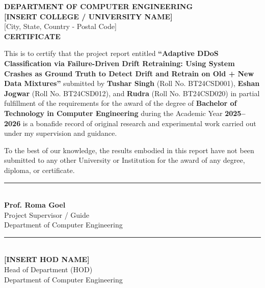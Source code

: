 \documentclass[12pt,a4paper,oneside]{report}
\begin{document}
\newpage
\thispagestyle{plain}
\begin{center}
{\Large \textbf{DEPARTMENT OF COMPUTER ENGINEERING}}\\[0.2cm]
{\large \textbf{[INSERT COLLEGE / UNIVERSITY NAME]}}\\[0.2cm]
{\normalsize [City, State, Country - Postal Code]}\\[1.0cm]

{\LARGE \textbf{CERTIFICATE}}\\[1.0cm]
\end{center}

\noindent This is to certify that the project report entitled \textbf{``Adaptive DDoS Classification via Failure-Driven Drift Retraining: Using System Crashes as Ground Truth to Detect Drift and Retrain on Old + New Data Mixtures''} submitted by \textbf{Tushar Singh} (Roll No. BT24CSD001), \textbf{Eshan Jogwar} (Roll No. BT24CSD012), and \textbf{Rudra} (Roll No. BT24CSD020) in partial fulfillment of the requirements for the award of the degree of \textbf{Bachelor of Technology in Computer Engineering} during the Academic Year \textbf{2025--2026} is a bonafide record of original research and experimental work carried out under my supervision and guidance.

\vspace{0.6cm}
\noindent To the best of our knowledge, the results embodied in this report have not been submitted to any other University or Institution for the award of any degree, diploma, or certificate.

\vspace{3.0cm}

\noindent
\begin{minipage}{0.48\textwidth}
\begin{center}
\rule{6cm}{0.4pt}\\[0.2cm]
\textbf{Prof. Roma Goel}\\[0.1cm]
Project Supervisor / Guide\\
Department of Computer Engineering
\end{center}
\end{minipage}
\hfill
\begin{minipage}{0.48\textwidth}
\begin{center}
\rule{6cm}{0.4pt}\\[0.2cm]
\textbf{[INSERT HOD NAME]}\\[0.1cm]
Head of Department (HOD)\\
Department of Computer Engineering
\end{center}
\end{minipage}
\end{document}
